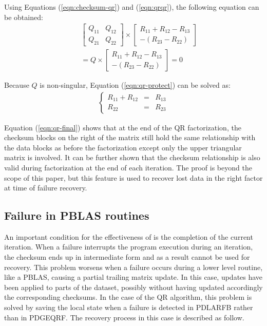 Using Equations (\ref{eqn:checksum-qr}) and (\ref{eqn:qrqr}), the following equation can be obtained:
\begin{eqnarray}
\label{eqn:qr-protect}
&&\begin{bmatrix}
Q_{11} & Q_{12}\\ 
Q_{21} & Q_{22}
\end{bmatrix}\times \begin{bmatrix}
R_{11}+R_{12}-R_{13}\\ 
-(R_{23}-R_{22})
\end{bmatrix}\nonumber \\
&&=Q\times \begin{bmatrix}
R_{11}+R_{12}-R_{13}\\ 
-(R_{23}-R_{22})
\end{bmatrix}=0
\end{eqnarray}

Because $Q$ is non-singular, Equation (\ref{eqn:qr-protect}) can be solved as:
\begin{eqnarray}
\label{eqn:qr-final}
\left\{\begin{matrix}
R_{11}+R_{12}&=&R_{13}\\ 
R_{22}&=&R_{23}
\end{matrix}\right.
\end{eqnarray}

Equation (\ref{eqn:qr-final}) shows that at the end of the QR
factorization, the checksum blocks on the right of the matrix still
hold the same relationship with the data blocks as before the
factorization except only the upper triangular matrix is involved. It
can be further shown that the checksum relationship is also valid
during factorization at the end of each iteration. The proof is beyond
the scope of this paper, but this feature is used to recover lost data
in the right factor at time of failure recovery.

\subsection{Failure in PBLAS routines}
An important condition for the effectiveness of \abft is the
completion of the current iteration. When a failure interrupts the
program execution during an iteration, the checksum ends up in
intermediate form and as a result cannot be used for recovery.  This
problem worsens when a failure occurs during a lower level routine, 
like a PBLAS, causing a partial trailing matrix update. In this case, updates have been applied to parts of the dataset, possibly without having updated accordingly the corresponding checksums. In the case of the QR algorithm, this problem
is solved by saving the local state when a failure is detected in
PDLARFB rather than in PDGEQRF. The recovery
process in this case is described as follow.

